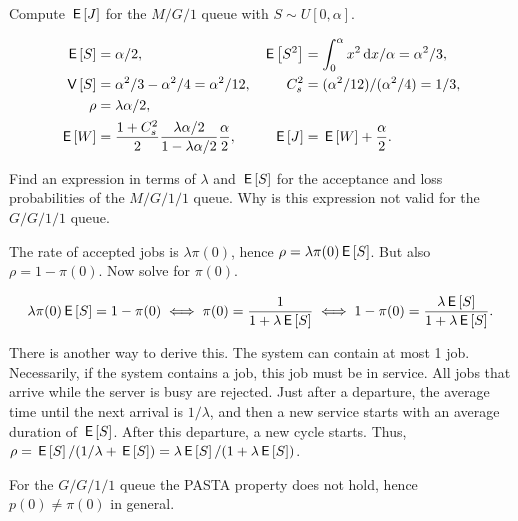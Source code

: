 \documentclass[queueing-book.tex]{subfiles}
\begin{document}
\begin{exercise}
 Compute $\,\mathsf{E}\left[J\right]$ for the $M/G/1$ queue with $S\sim U[0,\alpha]$.
\begin{solution}
 \begin{align*}
\,\mathsf{E}\left[S\right] &= \alpha/2, & \,\mathsf{E}\left[S^2\right] &= \int_0^\alpha x^2 \,\textrm{d}x/\alpha = \alpha^2/3,\\
\,\mathsf{V}\left[S\right] &= \alpha^2/3 - \alpha^2/4= \alpha^2/12, & C_s^2 &= (\alpha^2/12)/(\alpha^2/4) = 1/3,\\
\rho &= \lambda \alpha/2,\\
\,\mathsf{E}\left[W\right] &= \frac{1+C_s^2}2 \frac{\lambda \alpha/2}{1-\lambda \alpha/2}\frac \alpha2, &
\,\mathsf{E}\left[J\right] &= \,\mathsf{E}\left[W\right] + \frac \alpha2.
 \end{align*}
\end{solution}
\end{exercise}


\begin{exercise}
Find an expression in terms of $\lambda$ and $\,\mathsf{E}\left[S\right]$ for the acceptance and loss probabilities of  the $M/G/1/1$ queue.
Why is this expression not valid for the $G/G/1/1$ queue.
\begin{hint}
 The rate of accepted jobs is $\lambda \pi(0)$, hence $\rho= \lambda \pi(0) \,\mathsf{E}\left[S\right]$.
But also $\rho = 1-\pi(0)$.  Now solve for $\pi(0)$.
\end{hint}
\begin{solution}
 \begin{equation*}
 \lambda\pi(0) \,\mathsf{E}\left[S\right] = 1 - \pi(0) \iff \pi(0)=\frac1{1+\lambda\,\mathsf{E}\left[S\right]}
\iff 1-\pi(0) = \frac{\lambda \,\mathsf{E}\left[S\right]}{1+\lambda \,\mathsf{E}\left[S\right]}.
 \end{equation*}

 There is another way to derive this.
 The system can contain at most 1 job.
 Necessarily, if the system contains a job, this job must be in service.
 All jobs that arrive while the server is busy are rejected.
 Just after a departure, the average time until the next arrival is $1/\lambda$, and then a new service starts with an average duration of $\,\mathsf{E}\left[S\right]$.
 After this departure, a new cycle starts.
 Thus, $\rho = \,\mathsf{E}\left[S\right]/(1/\lambda + \,\mathsf{E}\left[S\right]) = \lambda \,\mathsf{E}\left[S\right]/ (1 + \lambda \,\mathsf{E}\left[S\right])$.


For the $G/G/1/1$ queue the PASTA property does not hold, hence $p(0)\neq \pi(0)$ in general.
\end{solution}
\end{exercise}



\end{document}
